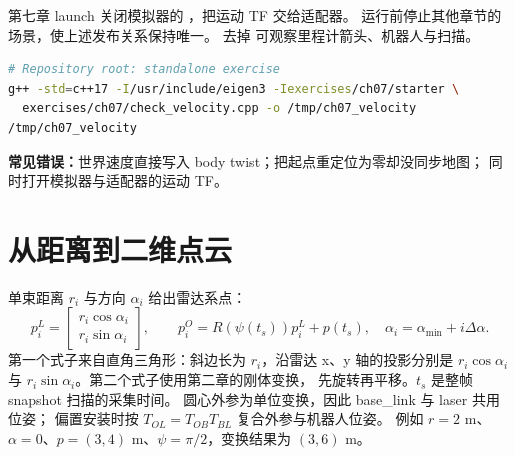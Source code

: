 \par\noindent\begin{minipage}{\linewidth}

\end{minipage}\par

第七章 launch 关闭模拟器的 ，把运动 TF 交给适配器。
运行前停止其他章节的场景，使上述发布关系保持唯一。
去掉  可观察里程计箭头、机器人与扫描。

\begin{lstlisting}[language=bash,numbers=none]
# Repository root: standalone exercise
g++ -std=c++17 -I/usr/include/eigen3 -Iexercises/ch07/starter \
  exercises/ch07/check_velocity.cpp -o /tmp/ch07_velocity
/tmp/ch07_velocity
\end{lstlisting}
\textbf{常见错误：}世界速度直接写入 body twist；把起点重定位为零却没同步地图；
同时打开模拟器与适配器的运动 TF。

\section{从距离到二维点云}
单束距离 $r_i$ 与方向 $\alpha_i$ 给出雷达系点：
\begin{equation}
 p_i^L=\begin{bmatrix}r_i\cos\alpha_i\\r_i\sin\alpha_i\end{bmatrix},
 \qquad p_i^O=R(\psi(t_s))p_i^L+p(t_s),\quad
 \alpha_i=\alpha_{\min}+i\Delta\alpha.
\end{equation}
第一个式子来自直角三角形：斜边长为 $r_i$，沿雷达 x、y 轴的投影分别是
$r_i\cos\alpha_i$ 与 $r_i\sin\alpha_i$。第二个式子使用第二章的刚体变换，
先旋转再平移。$t_s$ 是整帧 snapshot 扫描的采集时间。
圆心外参为单位变换，因此 base\_link 与 laser 共用位姿；
偏置安装时按 $T_{OL}=T_{OB}T_{BL}$ 复合外参与机器人位姿。
例如 $r=2$ m、$\alpha=0$、$p=(3,4)$ m、$\psi=\pi/2$，变换结果为 $(3,6)$ m。

\par\noindent\begin{minipage}{\linewidth}

\end{minipage}\par

